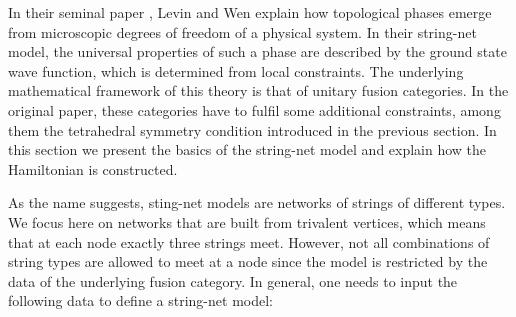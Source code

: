 In their seminal paper \cite{Levin2005}, Levin and Wen explain how topological phases emerge from microscopic degrees of freedom of a physical system. In their string-net model, the universal properties of such a phase are described by the ground state wave function, which is determined from local constraints. The underlying mathematical framework of this theory is that of unitary fusion categories. In the original paper, these categories have to fulfil some additional constraints, among them the tetrahedral symmetry condition introduced in the previous section. In this section we present the basics of the string-net model and explain how the Hamiltonian is constructed. 

As the name suggests, sting-net models are networks of strings of different types. We focus here on networks that are built from trivalent vertices, which means that at each node exactly three strings meet. However, not all combinations of string types are allowed to meet at a node since the model is restricted by the data of the underlying fusion category. In general, one needs to input the following data to define a string-net model:
